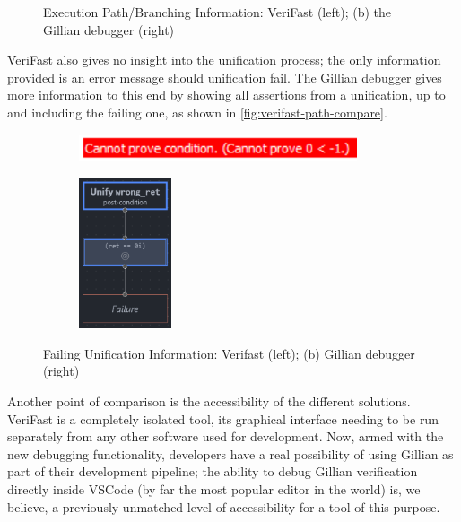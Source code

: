 \begin{figure}
\begin{subfigure}[b]{0.4\textwidth}
  \end{subfigure}
  \caption{Execution Path/Branching Information: VeriFast (left); (b) the Gillian
  debugger (right)}%
  \label{fig:verifast-path-compare}
\end{figure}

VeriFast also gives no insight into the unification process; the only
information provided is an error message should unification fail. The Gillian
debugger gives more information to this end by showing all assertions from
a unification, up to and including the failing one, as shown in \autoref{fig:verifast-path-compare}.

\begin{figure}
  \centering
  \begin{subfigure}[b]{0.4\textwidth}
    \center{}
    \includegraphics[width=0.9\textwidth]{img/verifast-error.png}
  \end{subfigure}
  \qquad
  \begin{subfigure}[b]{0.4\textwidth}
    \centering
    \includegraphics[width=0.3\textwidth]{img/unifymap-failure.png}
  \end{subfigure}
  \caption{Failing Unification Information: Verifast (left); (b) Gillian debugger (right)}%
  \label{fig:verifast-unifyfail-compare}
\end{figure}

Another point of comparison is the accessibility of the different solutions.
VeriFast is a completely isolated tool, its graphical interface needing to be
run separately from any other software used for development. Now, armed with the
new debugging functionality, developers have a real possibility of using Gillian
as part of their development pipeline; the ability to debug Gillian verification
directly inside VSCode (by far the most popular editor in the world) is, we believe, a
previously unmatched level of accessibility for a tool of this purpose.

